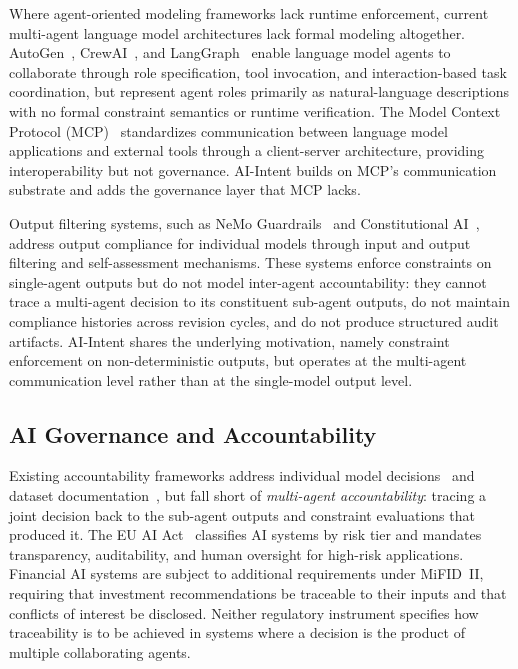 \documentclass[runningheads]{llncs}
\begin{document}
Where agent-oriented modeling frameworks lack runtime enforcement,
current multi-agent language model architectures lack formal modeling
altogether. AutoGen~\cite{wu2023autogen}, CrewAI~\cite{crewai2024}, and
LangGraph~\cite{langgraph2024} enable language model agents to
collaborate through role specification, tool invocation, and
interaction-based task coordination, but represent agent roles primarily
as natural-language descriptions with no formal constraint semantics or
runtime verification. The Model Context Protocol
(MCP)~\cite{anthropic2024mcp} standardizes communication between
language model applications and external tools through a client-server
architecture, providing interoperability but not governance. AI-Intent
builds on MCP's communication substrate and adds the governance layer
that MCP lacks.

Output filtering systems, such as NeMo
Guardrails~\cite{rebedea2023nemo} and Constitutional
AI~\cite{bai2022constitutional}, address output compliance for
individual models through input and output filtering and self-assessment
mechanisms. These systems enforce constraints on single-agent outputs
but do not model inter-agent accountability: they cannot trace a
multi-agent decision to its constituent sub-agent outputs, do not
maintain compliance histories across revision cycles, and do not produce
structured audit artifacts. AI-Intent shares the underlying motivation,
namely constraint enforcement on non-deterministic outputs, but operates
at the multi-agent communication level rather than at the single-model
output level.

\subsection{AI Governance and Accountability}
\label{sec:aigov}

Existing accountability frameworks address individual model
decisions~\cite{arrieta2020explainable} and dataset
documentation~\cite{gebru2021datasheets,mitchell2019model}, but fall
short of \emph{multi-agent accountability}: tracing a joint decision
back to the sub-agent outputs and constraint evaluations that produced
it. The EU AI Act~\cite{euaiact2024} classifies AI systems by risk
tier and mandates transparency, auditability, and human oversight for
high-risk applications. Financial AI systems are subject to additional
requirements under MiFID~II, requiring that investment recommendations
be traceable to their inputs and that conflicts of interest be disclosed.
Neither regulatory instrument specifies how traceability is to be
achieved in systems where a decision is the product of multiple
collaborating agents.
\end{document}
